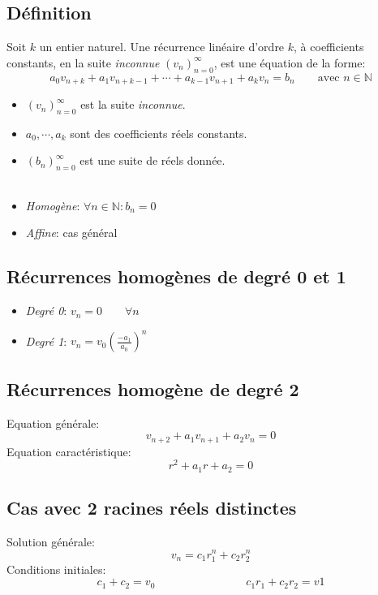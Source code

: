 \subsection{Définition}
Soit $k$ un entier naturel. Une récurrence linéaire d'ordre $k$, à coefficients constants, en la suite \emph{inconnue} $(v_n)_{n = 0}^{\infty}$, est une équation de la forme:
\[a_0v_{n+k} + a_1v_{n+k-1} + \cdots + a_{k-1}v_{n+1} + a_kv_n = b_n \qquad \text{avec }n \in \mathbb{N}\]
\begin{itemize}
\item $(v_n)^{\infty}_{n = 0}$ est la suite \emph{inconnue}.\\
\item $a_0, \cdots , a_k$ sont des coefficients réels constants.\\
\item $(b_n)_{n = 0}^{\infty}$ est une suite de réels donnée.\\\\
\end{itemize}
\begin{itemize}
\item \emph{Homogène}: $\forall n \in \mathbb{N} : b_n = 0$\\
\item \emph{Affine}: cas général\\
\end{itemize}
\subsection{Récurrences homogènes de degré 0 et 1}
\begin{itemize}
\item \emph{Degré 0}: $v_n = 0 \qquad \forall n$\\
\item \emph{Degré 1}: $v_n = v_0\left (\frac{-a_1}{a_0} \right )^n$\\
\end{itemize}

\subsection{Récurrences homogène de degré 2}
Equation générale:
\[v_{n+2} + a_1v_{n+1} + a_2v_n = 0\]
Equation caractéristique:
\[r^2 + a_1r + a_2 = 0\]
\subsection{Cas avec 2 racines réels distinctes}
Solution générale:
\[v_n = c_1r_1^n + c_2r_2^n\]
Conditions initiales:
\[c_1 + c_2 = v_0 \qquad{\qquad{\qquad{\qquad}}} c_1r_1 + c_2r_2 = v1\]
